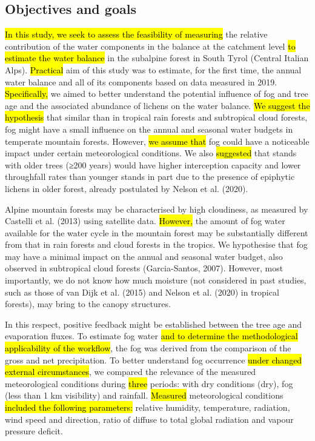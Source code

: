 \documentclass[10pt,letterpaper]{article}
\begin{document}
\subsection{Objectives and goals}

\hl{In this study, we seek to assess the feasibility of measuring} the relative contribution of the water components in the balance at the catchment level \hl{to estimate the water balance} in the subalpine forest in South Tyrol (Central Italian Alps). \hl{Practical} aim of this study was to estimate, for the first time, the annual water balance and all of its components based on data measured in 2019. \hl{Specifically,} we aimed to better understand the potential influence of fog and tree age and the associated abundance of lichens on the water balance. \hl{We suggest the hypothesis} that similar than in tropical rain forests and subtropical cloud forests, fog might have a small influence on the annual and seasonal water budgets in temperate mountain forests. However, \hl{we assume that }fog could have a noticeable impact under certain meteorological conditions. We also \hl{suggested} that stands with older trees (≥200 years) would have higher interception capacity and lower throughfall rates than younger stands in part due to the presence of epiphytic lichens in older forest, already postulated by Nelson et al. (2020). 

Alpine mountain forests may be characterised by high cloudiness, as measured by Castelli et al. (2013) using satellite data.\hl{ However, }the amount of fog water available for the water cycle in the mountain forest may be substantially different from that in rain forests and cloud forests in the tropics. We hypothesise that fog may have a minimal impact on the annual and seasonal water budget, also observed in subtropical cloud forests (Garcia-Santos, 2007). However, most importantly, we do not know how much moisture (not considered in past studies, such as those of van Dijk et al. (2015) and Nelson et al. (2020) in tropical forests), may bring to the canopy structures.

In this respect, positive feedback might be established between the tree age and evaporation fluxes. To estimate fog water \hl{and to determine the methodological applicability of the workflow}, the fog was derived from the comparison of the gross and net precipitation. To better understand fog occurrence \hl{under changed external circumstances}, we compared the relevance of the measured meteorological conditions during \hl{three} periods: with dry conditions (dry), fog (less than 1 km visibility) and rainfall. \hl{Measured} meteorological conditions \hl{included the following parameters: }relative humidity, temperature, radiation, wind speed and direction, ratio of diffuse to total global radiation and vapour pressure deficit.
\end{document}
